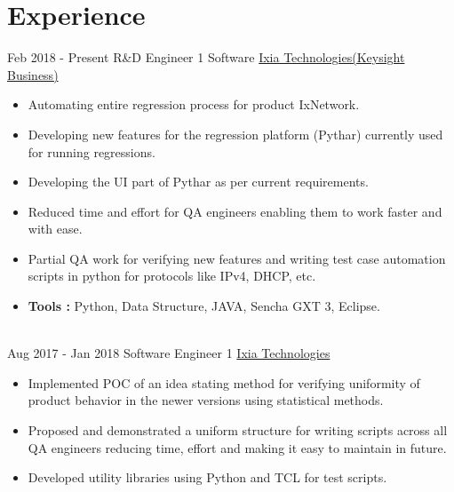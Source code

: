 \documentclass[letterpaper]{twentysecondcv} %
\begin{document}
\makeprofile %
 

\section{Experience}

\begin{twenty} %

	\twentyitem
    	{Feb 2018 -}
		{Present}
        {R\&D Engineer 1 Software}
        {\href{https://www.ixiacom.com/keysight-technologies/}{Ixia Technologies(Keysight Business)}}
        {}
        {
        {\begin{itemize}
        \item Automating entire regression process for product IxNetwork.
        \item Developing new features for the regression platform (Pythar) currently used for running regressions. 
        \item Developing the UI part of Pythar as per current requirements. 			\item Reduced time and effort  for QA engineers enabling them to work faster and with ease. 
		\item Partial QA work for verifying new features and writing test case automation scripts in python for protocols like IPv4, DHCP, etc.
		\item \textbf{Tools :} Python, Data Structure, JAVA, Sencha GXT 3, Eclipse.
    \end{itemize}}
        }
    \\   
    \twentyitem
   		{Aug 2017 -}
		{Jan 2018}
        {Software Engineer 1}
        {\href{https://www.ixiacom.com/}{Ixia Technologies}}
        {}
        {
        {\begin{itemize}
        \item Implemented POC of an idea stating method for verifying uniformity of product behavior in the newer versions using statistical methods.
		\item Proposed and demonstrated a uniform structure for writing scripts across all QA engineers reducing time, effort and making it easy to maintain in future.
		\item Developed utility libraries using Python and TCL for test scripts.

\end{itemize}}}
\end{twenty}
\end{document}
